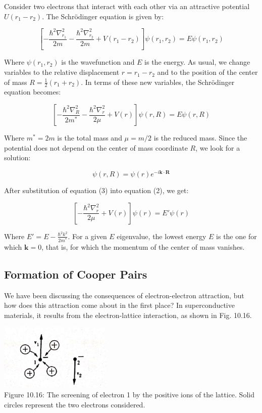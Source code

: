 \documentclass{article}
\begin{document}
Consider two electrons that interact with each other via an attractive potential $U(r_1 - r_2)$. The Schrödinger equation is given by:

\[
\left[ -\frac{\hbar^2 \nabla_{r_1}^2}{2m} - \frac{\hbar^2 \nabla_{r_2}^2}{2m} + V(r_1 - r_2) \right] \psi(r_1, r_2) = E \psi(r_1, r_2) \tag{1}
\]

Where $\psi(r_1, r_2)$ is the wavefunction and $E$ is the energy. As usual, we change variables to the relative displacement $r = r_1 - r_2$ and to the position of the center of mass $R = \frac{1}{2}(r_1 + r_2)$. In terms of these new variables, the Schrödinger equation becomes:

\[
\left[ -\frac{\hbar^2 \nabla_{R}^2}{2m^*} - \frac{\hbar^2 \nabla_{r}^2}{2\mu} + V(r) \right] \psi(r, R) = E \psi(r, R) \tag{2}
\]

Where $m^* = 2m$ is the total mass and $\mu = m/2$ is the reduced mass. Since the potential does not depend on the center of mass coordinate $R$, we look for a solution:

\[
\psi(r, R) = \psi(r) e^{-i\mathbf{k} \cdot \mathbf{R}} \tag{3}
\]

After substitution of equation (3) into equation (2), we get:

\[
\left[ -\frac{\hbar^2 \nabla_{r}^2}{2\mu} + V(r) \right] \psi(r) = E' \psi(r) \tag{4}
\]

Where $E' = E - \frac{\hbar^2 k^2}{2m^*}$. For a given $E$ eigenvalue, the lowest energy $E$ is the one for which $\mathbf{k} = 0$, that is, for which the momentum of the center of mass vanishes.

\subsection{Formation of Cooper Pairs}

We have been discussing the consequences of electron-electron attraction, but how does this attraction come about in the first place? In superconductive materials, it results from the electron-lattice interaction, as shown in Fig. 10.16.

\begin{center}
    \includegraphics[width=0.4\textwidth]{figures/electron_lattice_interaction.png} \\
    Figure 10.16: The screening of electron 1 by the positive ions of the lattice. Solid circles represent the two electrons considered.
\end{center}
\end{document}
